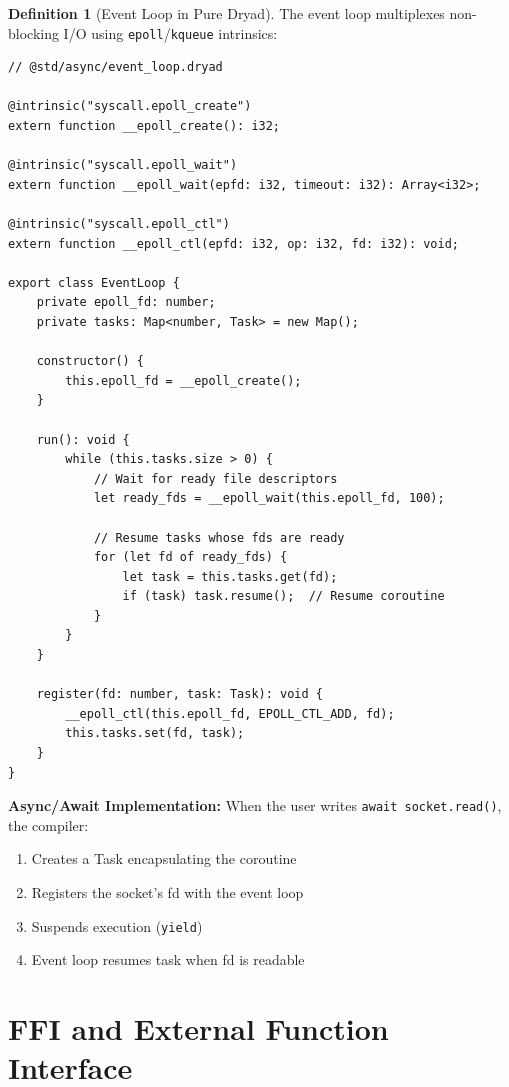 \documentclass[12pt,a4paper]{article}
\theoremstyle{definition}
\newtheorem{definition}{Definition}[section]
\begin{document}
\begin{definition}[Event Loop in Pure Dryad]
The event loop multiplexes non-blocking I/O using \texttt{epoll}/\texttt{kqueue} intrinsics:

\begin{lstlisting}[language=Dryad]
// @std/async/event_loop.dryad

@intrinsic("syscall.epoll_create")
extern function __epoll_create(): i32;

@intrinsic("syscall.epoll_wait")
extern function __epoll_wait(epfd: i32, timeout: i32): Array<i32>;

@intrinsic("syscall.epoll_ctl")
extern function __epoll_ctl(epfd: i32, op: i32, fd: i32): void;

export class EventLoop {
    private epoll_fd: number;
    private tasks: Map<number, Task> = new Map();
    
    constructor() {
        this.epoll_fd = __epoll_create();
    }
    
    run(): void {
        while (this.tasks.size > 0) {
            // Wait for ready file descriptors
            let ready_fds = __epoll_wait(this.epoll_fd, 100);
            
            // Resume tasks whose fds are ready
            for (let fd of ready_fds) {
                let task = this.tasks.get(fd);
                if (task) task.resume();  // Resume coroutine
            }
        }
    }
    
    register(fd: number, task: Task): void {
        __epoll_ctl(this.epoll_fd, EPOLL_CTL_ADD, fd);
        this.tasks.set(fd, task);
    }
}
\end{lstlisting}

\textbf{Async/Await Implementation:}
When the user writes \texttt{await socket.read()}, the compiler:
\begin{enumerate}[leftmargin=*]
    \item Creates a Task encapsulating the coroutine
    \item Registers the socket's fd with the event loop
    \item Suspends execution (\texttt{yield})
    \item Event loop resumes task when fd is readable
\end{enumerate}
\end{definition}

\newpage

\section{FFI and External Function Interface}
\end{document}
